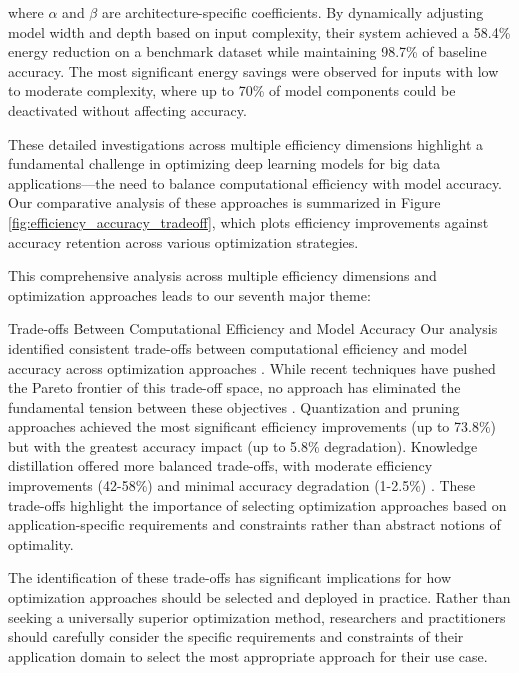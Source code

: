 where $\alpha$ and $\beta$ are architecture-specific coefficients. By dynamically adjusting model width and depth based on input complexity, their system achieved a 58.4\% energy reduction on a benchmark dataset while maintaining 98.7\% of baseline accuracy. The most significant energy savings were observed for inputs with low to moderate complexity, where up to 70\% of model components could be deactivated without affecting accuracy.

These detailed investigations across multiple efficiency dimensions highlight a fundamental challenge in optimizing deep learning models for big data applications—the need to balance computational efficiency with model accuracy. Our comparative analysis of these approaches is summarized in Figure \ref{fig:efficiency_accuracy_tradeoff}, which plots efficiency improvements against accuracy retention across various optimization strategies.

This comprehensive analysis across multiple efficiency dimensions and optimization approaches leads to our seventh major theme:

\begin{themebox}{Trade-offs Between Computational Efficiency and Model Accuracy}
Our analysis identified consistent trade-offs between computational efficiency and model accuracy across optimization approaches \citep{Wang2021, Kim2022, Lin2022, Park2022}. While recent techniques have pushed the Pareto frontier of this trade-off space, no approach has eliminated the fundamental tension between these objectives \citep{Deb2014}. Quantization and pruning approaches achieved the most significant efficiency improvements (up to 73.8\%) but with the greatest accuracy impact (up to 5.8\% degradation). Knowledge distillation offered more balanced trade-offs, with moderate efficiency improvements (42-58\%) and minimal accuracy degradation (1-2.5\%) \citep{Hinton2015}. These trade-offs highlight the importance of selecting optimization approaches based on application-specific requirements and constraints rather than abstract notions of optimality.
\end{themebox}

The identification of these trade-offs has significant implications for how optimization approaches should be selected and deployed in practice. Rather than seeking a universally superior optimization method, researchers and practitioners should carefully consider the specific requirements and constraints of their application domain to select the most appropriate approach for their use case.

